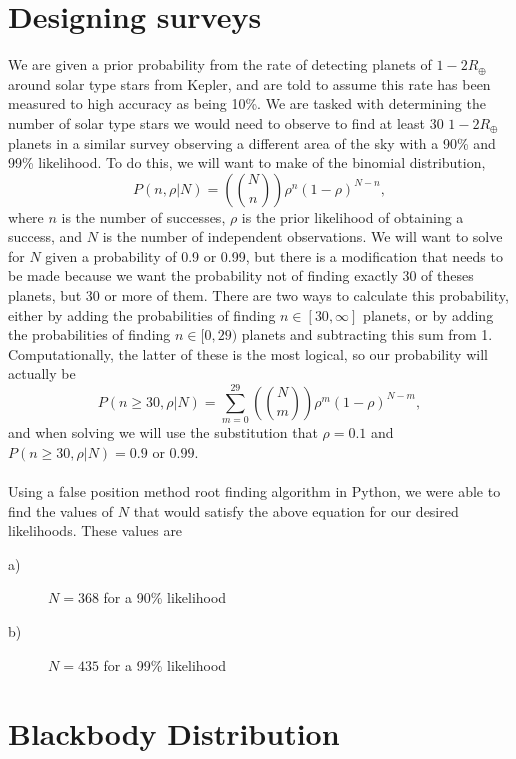 \documentclass[12pt,a4paper]{article}
\begin{document}
\section{Designing surveys}
We are given a prior probability from the rate of detecting planets of $1-2 R_{\oplus}$ around solar type stars from Kepler, and are told to assume this rate has been measured to high accuracy as being 10\%. We are tasked with determining the number of solar type stars we would need to observe to find at least 30 $1-2 R_{\oplus}$ planets in a similar survey observing a different area of the sky with a 90\% and 99\% likelihood. To do this, we will want to make of the binomial distribution,
\begin{equation*}
  P(n, \rho | N) = \left(N \choose n\right) \rho^n \left(1 - \rho\right)^{N - n},
\end{equation*}
where $n$ is the number of successes, $\rho$ is the prior likelihood of obtaining a success, and $N$ is the number of independent observations. We will want to solve for $N$ given a probability of 0.9 or 0.99, but there is a modification that needs to be made because we want the probability not of finding exactly 30 of theses planets, but 30 or more of them. There are two ways to calculate this probability, either by adding the probabilities of finding $n \in {[30, \infty]}$ planets, or by adding the probabilities of finding $n \in {[0, 29)}$ planets and subtracting this sum from 1. Computationally, the latter of these is the most logical, so our probability will actually be
  \begin{equation*}
    P(n \ge 30, \rho | N) = \sum_{m = 0}^{29} \left(N \choose m\right) \rho^m \left(1 - \rho\right)^{N - m},
  \end{equation*}
  and when solving we will use the substitution that $\rho = 0.1$ and $P(n \ge 30, \rho | N) = 0.9$ or $0.99$.\\\\
Using a false position method root finding algorithm in Python, we were able to find the values of $N$ that would satisfy the above equation for our desired likelihoods. These values are
\begin{description}
  \item [\normalfont a)]$N = 368$ for a 90\% likelihood
  \item [\normalfont b)]$N = 435$ for a 99\% likelihood
\end{description}

\section{Blackbody Distribution}
\end{document}
